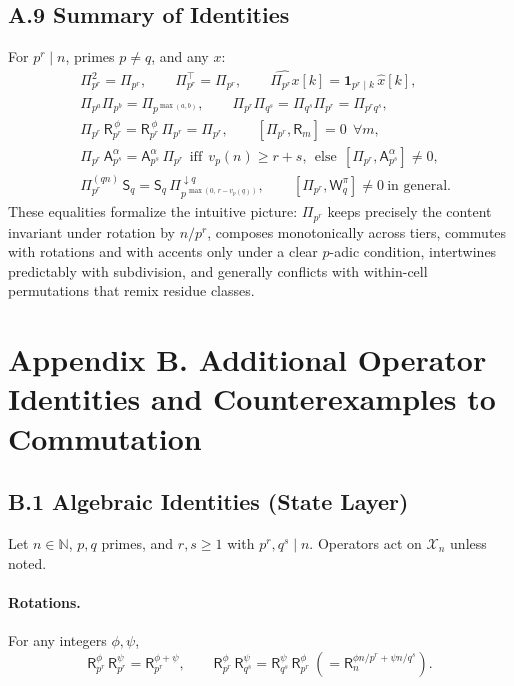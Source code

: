 \documentclass[12pt]{article}
\numberwithin{equation}{section}
\theoremstyle{plain}
\theoremstyle{definition}
\theoremstyle{remark}
\begin{document}
\subsection*{A.9 Summary of Identities}
For $p^r\mid n$, primes $p\neq q$, and any $x$:
\begin{align*}
&\Pi_{p^r}^2=\Pi_{p^r},\qquad \Pi_{p^r}^\top=\Pi_{p^r},\qquad
\widehat{\Pi_{p^r}x}[k]=\mathbf{1}_{p^r\mid k}\,\widehat{x}[k],\\
&\Pi_{p^a}\Pi_{p^b}=\Pi_{p^{\max(a,b)}},\qquad
\Pi_{p^r}\Pi_{q^s}=\Pi_{q^s}\Pi_{p^r}=\Pi_{p^r q^s},\\
&\Pi_{p^r}\,\mathsf{R}_{p^r}^{\,\phi}=\mathsf{R}_{p^r}^{\,\phi}\,\Pi_{p^r}=\Pi_{p^r},\qquad
[\Pi_{p^r},\mathsf{R}_m]=0\ \ \forall m,\\
&\Pi_{p^r}\,\mathsf{A}_{p^s}^{\alpha}=\mathsf{A}_{p^s}^{\alpha}\,\Pi_{p^r}\ \ \text{iff}\ \ v_p(n)\ge r+s,\ \ \text{else}\ \ [\Pi_{p^r},\mathsf{A}_{p^s}^{\alpha}]\neq 0,\\
&\Pi_{p^r}^{(qn)}\,\mathsf{S}_q=\mathsf{S}_q\,\Pi_{p^{\,\max(0,\,r-v_p(q))}}^{\downarrow q},\qquad
[\Pi_{p^r},\mathsf{W}_q^{\pi}]\neq 0\ \text{in general}.
\end{align*}
These equalities formalize the intuitive picture: $\Pi_{p^r}$ keeps precisely the content invariant under rotation by $n/p^r$, composes monotonically across tiers, commutes with rotations and with accents only under a clear $p$-adic condition, intertwines predictably with subdivision, and generally conflicts with within-cell permutations that remix residue classes.

\section*{Appendix B. Additional Operator Identities and Counterexamples to Commutation}

\subsection*{B.1 Algebraic Identities (State Layer)}
Let $n\in\mathbb{N}$, $p,q$ primes, and $r,s\ge 1$ with $p^r,q^s\mid n$. Operators act on $\mathcal{X}_n$ unless noted.

\paragraph{Rotations.} For any integers $\phi,\psi$,
\[
\mathsf{R}_{p^r}^{\phi}\,\mathsf{R}_{p^r}^{\psi}=\mathsf{R}_{p^r}^{\phi+\psi},\qquad
\mathsf{R}_{p^r}^{\phi}\,\mathsf{R}_{q^s}^{\psi}=\mathsf{R}_{q^s}^{\psi}\,\mathsf{R}_{p^r}^{\phi}\ (= \mathsf{R}_n^{\phi n/p^r+\psi n/q^s}).
\]
\end{document}

